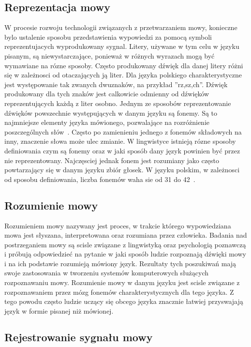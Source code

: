\documentclass[a4paper,12 pt]{report}
\begin{document}
\subsection{Reprezentacja mowy}
W procesie rozwoju technologii związanych z  przetwarzaniem mowy, konieczne bylo ustalenie sposobu przedstawienia wypowiedzi za pomocą symboli reprezentujacych wyprodukowany sygnal. Litery, używane w tym celu w języku pisanym, są niewystarczające, ponieważ w różnych wyrazach mogą być wymawiane na rózne sposoby.  Często produkowany dźwięk dla danej litery różni się w zależnosci od otaczających ją liter. Dla języka polskiego charakterystyczne jest występowanie tak zwanych dwuznaków, na przykład ''rz,sz,ch''. Dźwięk produkowany dla tych znaków jest calkowicie odmienny od dźwięków reprezentujących każdą z liter osobno. 
Jednym ze sposobów reprezentowanie dźwięków powszechnie występujących w danym języku są fonemy. Są to najmniejsze elementy języka mówionego, pozwalające na rozróżnienie poszczególnych słów~\cite{phonem}. Często po zamienieniu jednego z fonemów składowych na inny, znaczenie słowa może ulec zmianie. W lingwistyce istnieją rózne sposoby definiowania czym są fonemy oraz w jaki sposób dany język powinien być przez nie reprezentowany. Najczęsciej jednak fonem jest rozumiany jako często powtarzający się w danym języku zbiór głosek. W języku polskim, w zależnosci od sposobu definiowania, liczba fonemów waha sie od 31 do 42~\cite{liczba_fonem}.
\subsection{Rozumienie mowy}
Rozumieniem mowy nazywany jest proces, w trakcie którego wypowiedziana mowa jest słyszana, interpretowana oraz rozumiana przez człowieka. Badania nad postrzeganiem mowy są scisle związane
z lingwistyką oraz psychologią poznawczą i próbują odpowiedzieć na pytanie w jaki sposób ludzie rozpoznają dźwięki mowy i na ich podstawie rozumieją mówiony język. Rezultaty tych poszukiwań mają swoje zastosowania w tworzeniu systemów komputerowych służących rozpoznawaniu mowy. Rozumienie mowy w danym języku jest scisle związane z rozpoznawaniem przez mózg fonemów charakterystycznych dla tego języka. Z tego powodu często ludzie uczący się obcego języka znacznie łatwiej przyswajają język w formie pisanej niż mówionej.
\subsection{Rejestrowanie sygnału mowy}
\end{document}
